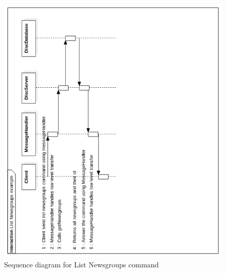 \documentclass[a4paper]{article}
\begin{document}
\begin{figure}[h]
    \centering
    \includegraphics[width=\textwidth]{listnewsgroups90.png}
    \caption{Sequence diagram for List Newsgroups command}
    \label{fig:awesome_image}
\end{figure}
\newpage
\end{document}
